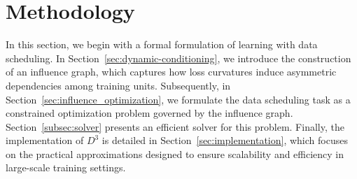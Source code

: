 \section{Methodology}

In this section, we begin with a formal formulation of learning with data scheduling. In Section~\ref{sec:dynamic-conditioning}, we introduce the construction of an influence graph, which captures how loss curvatures induce asymmetric dependencies among training units. Subsequently, in Section~\ref{sec:influence_optimization}, we formulate the data scheduling task as a constrained optimization problem governed by the influence graph. Section~\ref{subsec:solver} presents an efficient solver for this problem. Finally, the implementation of $D^3$ is detailed in Section~\ref{sec:implementation}, which focuses on the practical approximations designed to ensure scalability and efficiency in large-scale training settings.

